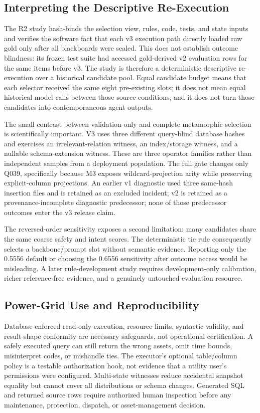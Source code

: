\documentclass[applsci,article,submit,moreauthors]{Definitions/mdpi}
\begin{document}
\subsection{Interpreting the Descriptive Re-Execution}

The R2 study hash-binds the selection view, rules, code, tests, and state inputs and verifies the software fact that each v3 execution path directly loaded raw gold only after all blackboards were sealed. This does not establish outcome blindness: its frozen test suite had accessed gold-derived v2 evaluation rows for the same items before v3. The study is therefore a deterministic descriptive re-execution over a historical candidate pool. Equal candidate budget means that each selector received the same eight pre-existing slots; it does not mean equal historical model calls between those source conditions, and it does not turn those candidates into contemporaneous agent outputs.

The small contrast between validation-only and complete metamorphic selection is scientifically important. V3 uses three different query-blind database hashes and exercises an irrelevant-relation witness, an index/storage witness, and a nullable schema-extension witness. These are three operator families rather than independent samples from a deployment population. The full gate changes only Q039, specifically because M3 exposes wildcard-projection arity while preserving explicit-column projections. An earlier v1 diagnostic used three same-hash insertion files and is retained as an excluded incident; v2 is retained as a provenance-incomplete diagnostic predecessor; none of those predecessor outcomes enter the v3 release claim.

The reversed-order sensitivity exposes a second limitation: many candidates share the same coarse safety and intent scores. The deterministic tie rule consequently selects a backbone/prompt slot without semantic evidence. Reporting only the 0.5556 default or choosing the 0.6556 sensitivity after outcome access would be misleading. A later rule-development study requires development-only calibration, richer reference-free evidence, and a genuinely untouched evaluation resource.

\subsection{Power-Grid Use and Reproducibility}

Database-enforced read-only execution, resource limits, syntactic validity, and result-shape conformity are necessary safeguards, not operational certification. A safely executed query can still return the wrong assets, omit time bounds, misinterpret codes, or mishandle ties. The executor's optional table/column policy is a testable authorization hook, not evidence that a utility user's permissions were configured. Multi-state witnesses reduce accidental snapshot equality but cannot cover all distributions or schema changes. Generated SQL and returned source rows require authorized human inspection before any maintenance, protection, dispatch, or asset-management decision.
\end{document}
